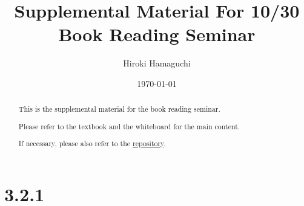 \documentclass[a4paper, 14pt, dvipdfmx]{extarticle}
\begin{document}
\title{Supplemental Material For 10/30\\Book Reading Seminar}
\author{Hiroki Hamaguchi}
\date{\today}
\maketitle

\begin{abstract}
    \begin{center}
        This is the supplemental material for the book reading seminar.

        Please refer to the textbook and the whiteboard for the main content.

        If necessary, please also refer to the \href{https://github.com/hari64boli64/BookReadingSeminarMaterials}{repository}.
    \end{center}
\end{abstract}

\section*{3.2.1}
\end{document}
